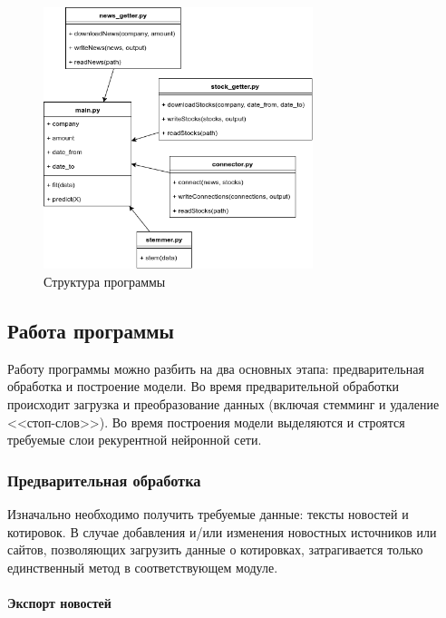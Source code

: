 \documentclass[14pt]{matmex-diploma-custom}
\begin{document}
\begin{figure}[h]
\centering
\includegraphics[width=0.7\textwidth]{img/class}
\caption{Структура программы}
\label{img:class}
\end{figure}

\subsection{Работа программы}

Работу программы можно разбить на два основных этапа: предварительная обработка и построение модели. Во время предварительной обработки происходит загрузка и преобразование данных (включая стемминг и удаление <<стоп-слов>>). Во время построения модели выделяются и строятся требуемые слои рекурентной нейронной сети.

\subsubsection{Предварительная обработка}

Изначально необходимо получить требуемые данные: тексты новостей и котировок. В случае добавления и/или изменения новостных источников или сайтов, позволяющих загрузить данные о котировках, затрагивается только единственный метод в соответствующем модуле.

\paragraph{Экспорт новостей}
\end{document}
